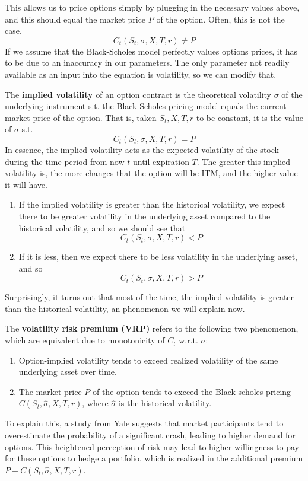 \documentclass{article}
\begin{document}
This allows us to price options simply by plugging in the necessary values above, and this should equal the market price $P$ of the option. Often, this is not the case. 
\[C_t ( S_t, \sigma, X, T, r) \neq P\]
If we assume that the Black-Scholes model perfectly values options prices, it has to be due to an inaccuracy in our parameters. The only parameter not readily available as an input into the equation is volatility, so we can modify that. 

\begin{definition}
The \textbf{implied volatility} of an option contract is the theoretical volatility $\sigma$ of the underlying instrument s.t. the Black-Scholes pricing model equals the current market price of the option. That is, taken $S_t, X, T, r$ to be constant, it is the value of $\sigma$ s.t. 
\[C_t (S_t, \sigma, X, T, r) = P \]
In essence, the implied volatility acts as the expected volatility of the stock during the time period from now $t$ until expiration $T$. The greater this implied volatility is, the more changes that the option will be ITM, and the higher value it will have. 
\end{definition}

\begin{enumerate}
    \item If the implied volatility is greater than the historical volatility, we expect there to be greater volatility in the underlying asset compared to the historical volatility, and so we should see that 
    \[C_t (S_t, \sigma, X, T, r) < P \]
    \item If it is less, then we expect there to be less volatility in the underlying asset, and so 
    \[C_t (S_t, \sigma, X, T, r) > P \]
\end{enumerate}
Surprisingly, it turns out that most of the time, the implied volatility is greater than the historical volatility, an phenomenon we will explain now. 

\begin{definition}
The \textbf{volatility risk premium (VRP)} refers to the following two phenomenon, which are equivalent due to monotonicity of $C_t$ w.r.t. $\sigma$: 
\begin{enumerate}
    \item Option-implied volatility tends to exceed realized volatility of the same underlying asset over time.  
    \item The market price $P$ of the option tends to exceed the Black-scholes pricing $C(S_t, \hat{\sigma}, X, T, r)$, where $\hat{\sigma}$ is the historical volatility. 
\end{enumerate}
To explain this, a study from Yale suggests that market participants tend to overestimate the probability of a significant crash, leading to higher demand for options. This heightened perception of risk may lead to higher willingness to pay for these options to hedge a portfolio, which is realized in the additional premium $P - C(S_t, \hat{\sigma}, X, T, r)$. 
\end{definition} 
\end{document}
